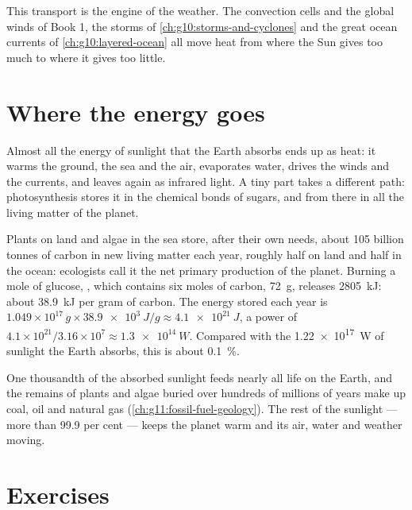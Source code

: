This transport is the engine of the weather. The convection cells and the
global winds of Book 1, the storms of \cref{ch:g10:storms-and-cyclones} and
the great ocean currents of \cref{ch:g10:layered-ocean} all move heat from
where the Sun gives too much to where it gives too little.

\section{Where the energy goes}

Almost all the energy of sunlight that the Earth absorbs ends up as heat:
it warms the ground, the sea and the air, evaporates water, drives the
winds and the currents, and leaves again as infrared light. A tiny part takes
a different path: photosynthesis stores it in the chemical bonds of sugars,
and from there in all the living matter of the planet.

\begin{example}\label{ex:g10:earth-energy-budget:photosynthesis}
Plants on land and algae in the sea store, after their own needs, about
\num{105} billion tonnes of carbon in new living matter each year, roughly
half on land and half in the ocean: ecologists call it the net primary
production of the planet. Burning a mole of glucose,
, which contains six moles of carbon, \qty{72}{g}, releases
\qty{2805}{kJ}: about \qty{38.9}{kJ} per gram of carbon. The energy stored
each year is $1.049\times10^{17}\,\unit{g} \times \qty{38.9e3}{J/g} \approx
\qty{4.1e21}{J}$, a power of $4.1\times10^{21}/3.16\times10^{7} \approx
\qty{1.3e14}{W}$. Compared with the \qty{1.22e17}{W} of sunlight the Earth
absorbs, this is about \qty{0.1}{\percent}.
\end{example}

\begin{remark}\label{rem:g10:earth-energy-budget:life}
One thousandth of the absorbed sunlight feeds nearly all life on the Earth,
and the remains of plants and algae buried over hundreds of millions of years
make up coal, oil and natural gas (\cref{ch:g11:fossil-fuel-geology}). The
rest of the sunlight --- more than 99.9 per cent --- keeps the planet warm
and its air, water and weather moving.
\end{remark}

\section{Exercises}

